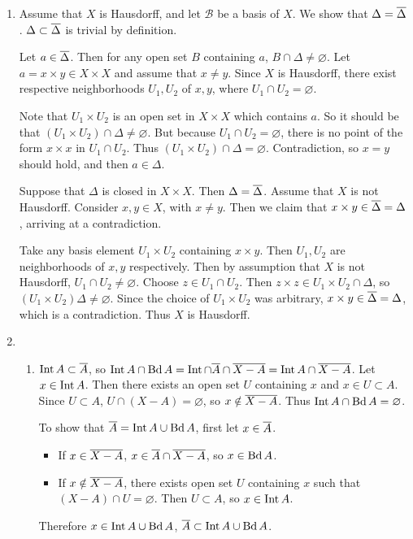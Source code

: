 \documentclass[12pt]{report}
\newcommand{\prob}[1]{\item[\large\textbf{\sffamily #1.}]}
\newcommand{\subprob}[1]{\item[\textbf{\sffamily (#1)}]}
\newcommand{\B}{\mathcal{B}}
\begin{document}
\begin{enumerate}
    \prob{5} Assume that \(X\) is Hausdorff, and let \(\B\) be a basis of \(X\). We show that \(\Delta = \overline{\Delta}\). \(\Delta \subset \overline{\Delta}\) is trivial by definition.

    \bigskip

    Let \(a \in \overline{\Delta}\). Then for any open set \(B\) containing \(a\), \(B \cap \Delta \neq \varnothing\). Let \(a = x \times y \in X\times X\) and assume that \(x \neq y\). Since \(X\) is Hausdorff, there exist respective neighborhoods \(U_1, U_2\) of \(x, y\), where \(U_1 \cap U_2 = \varnothing\).

    Note that \(U_1 \times U_2\) is an open set in \(X \times X\) which contains \(a\). So it should be that \((U_1\times U_2) \cap \Delta \neq \varnothing\). But because \(U_1 \cap U_2 = \varnothing\), there is no point of the form \(x \times x\) in \(U_1 \cap U_2\). Thus \((U_1 \times U_2) \cap \Delta = \varnothing\). Contradiction, so \(x = y\) should hold, and then \(a \in \Delta\).

    \bigskip

    Suppose that \(\Delta\) is closed in \(X \times X\). Then \(\Delta = \overline{\Delta}\). Assume that \(X\) is not Hausdorff. Consider \(x, y \in X\), with \(x \neq y\). Then we claim that \(x \times y \in \overline{\Delta} = \Delta\), arriving at a contradiction.

    Take any basis element \(U_1 \times U_2\) containing \(x \times y\). Then \(U_1, U_2\) are neighborhoods of \(x, y\) respectively. Then by assumption that \(X\) is not Hausdorff, \(U_1 \cap U_2 \neq \varnothing\). Choose \(z \in U_1 \cap U_2\). Then \(z\times z \in U_1 \times U_2 \cap \Delta\), so \((U_1 \times U_2) \Delta \neq \varnothing\). Since the choice of \(U_1 \times U_2\) was arbitrary, \(x\times y \in \overline{\Delta} = \Delta\), which is a contradiction. Thus \(X\) is Hausdorff.

    \prob{6}
    \begin{enumerate}
        \subprob{a} \(\operatorname{Int} A \subset \overline{A}\), so \(\operatorname{Int} A \cap \operatorname{Bd} A = \operatorname{Int} \cap \overline{A} \cap \overline{X - A} = \operatorname{Int} A \cap \overline{X - A}\). Let \(x \in \operatorname{Int} A\). Then there exists an open set \(U\) containing \(x\) and \(x \in U \subset A\). Since \(U \subset A\), \(U \cap (X - A) = \varnothing\), so \(x \notin \overline{X - A}\). Thus \(\operatorname{Int} A \cap \operatorname{Bd} A = \varnothing\).

        \bigskip

        To show that \(\overline{A} = \operatorname{Int} A \cup \operatorname{Bd} A\), first let \(x \in \overline{A}\).
        \begin{itemize}
            \item If \(x \in \overline{X - A}\), \(x \in \overline{A} \cap \overline{X - A}\), so \(x \in \operatorname{Bd} A\).
            \item If \(x \notin \overline{X - A}\), there exists open set \(U\) containing \(x\) such that \((X - A) \cap U = \varnothing\). Then \(U \subset A\), so \(x \in \operatorname{Int} A\).
        \end{itemize}
        Therefore \(x \in \operatorname{Int} A \cup \operatorname{Bd} A\), \(\overline{A} \subset \operatorname{Int} A \cup \operatorname{Bd} A\).


\end{enumerate}
\end{enumerate}
\end{document}
